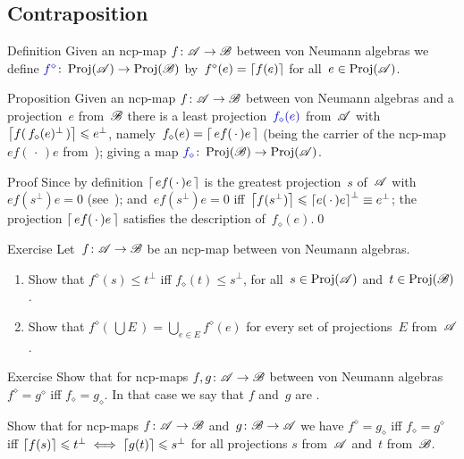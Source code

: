 \documentclass[a]{subfiles}
\begin{document}
\subsection{Contraposition}
\begin{parsec}%
\begin{point}{Definition}%
Given an ncp-map $f\colon \mathscr{A}\to\mathscr{B}$
between von Neumann algebras
we define
$\Define{f^\diamond}\colon \Proj(\scrA)\to \Proj(\scrB)$%
by~$f^\diamond(e)=\left\lceil f(e)\right\rceil$
for all~$e\in\operatorname{Proj}(\mathscr{A})$.
\end{point}
\begin{point}{Proposition}%
Given an ncp-map $f\colon \mathscr{A}\to\mathscr{B}$
between von Neumann algebras
and a projection~$e$ from~$\mathscr{B}$
there is a least projection~$\Define{f_\diamond(e)}$ from~$\mathscr{A}$%
with~$\left\lceil f(\,f_\diamond(e)^\perp\,)\right\rceil\leqslant e^\perp$,
namely~$f_\diamond(e) =\left\lceil\,ef(\,\cdot\,)e\,\right\rceil$
(being the carrier 
	of the ncp-map $ef(\,\cdot\,)e$ from~);
giving a map $\Define{f_\diamond}\colon \Proj(\scrB)\to\Proj(\scrA)$.
\begin{point}{Proof}%
Since by definition $\left\lceil\,ef(\,\cdot\,)e\,\right\rceil$
is the greatest projection~$s$ of~$\mathscr{A}$
with $ef(s^\perp)e=0$ (see~);
and~$ef(s^\perp )e=0$ iff~$\left\lceil f(s^\perp)\right\rceil
\leqslant\left\lceil e(\,\cdot\,)e\right\rceil^\perp\equiv
e^\perp$;
the projection
$\left\lceil\,ef(\,\cdot\,)e\,\right\rceil$
satisfies the description of~$f_\diamond(e)$.\qed
\end{point}
\end{point}
\begin{point}{Exercise}%
Let~$f\colon \mathscr{A}\to\mathscr{B}$ be an ncp-map between von Neumann algebras.
\begin{enumerate}
\item
Show that $f^\diamond(s)\leq t^\perp$
iff $f_\diamond(t)\leq s^\perp$,
for all~$s\in\operatorname{Proj}(\mathscr{A})$ and~$t\in\operatorname{Proj}(\mathscr{B})$.
\item
Show that $f^\diamond(\,\bigcup E\,)
= \bigcup_{e\in E} f^\diamond(e)$
for every set of projections~$E$ from~$\mathscr{A}$.
\end{enumerate}
\end{point}
\begin{point}{Exercise}%
Show that for ncp-maps $f,g\colon\mathscr{A}\to\mathscr{B}$
between von Neumann algebras $f^\diamond = g^\diamond$
iff $f_\diamond = g_\diamond$.
In that case we say that $f$ and~$g$ are .%
\begin{point}%
Show that for ncp-maps $f\colon \mathscr{A}\to\mathscr{B}$
and~$g\colon \mathscr{B}\to\mathscr{A}$ we have
$f^\diamond=g_\diamond$ iff $f_\diamond = g^\diamond$
iff $\left\lceil f(s)\right\rceil\leqslant t^\perp\iff \left\lceil g(t)\right\rceil\leqslant s^\perp$
for all projections $s$ from~$\mathscr{A}$ and~$t$ from~$\mathscr{B}$.


\end{point}
\end{point}
\end{parsec}
\end{document}
